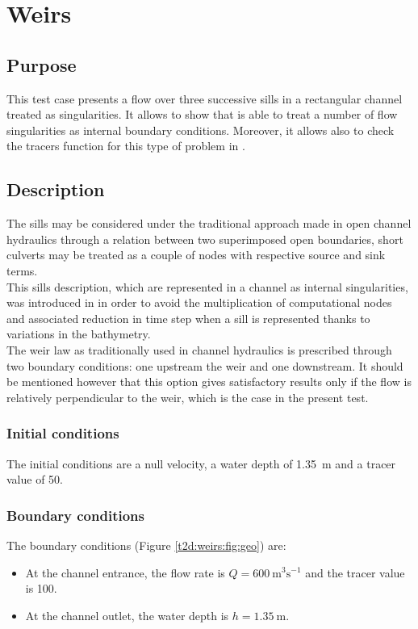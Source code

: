 \chapter{Weirs}

\section{Purpose}
This test case presents a flow over three successive sills in
a rectangular channel treated as singularities. It allows to show
that  is able to treat a number of flow singularities
as internal boundary conditions. Moreover, it allows also to check
the tracers function for this type of problem in .

\section{Description}

The sills may be considered under the traditional approach made
in open channel hydraulics through a relation between two superimposed
open boundaries, short culverts may be treated as a couple of nodes
 with respective source and sink terms.\\

This sills description, which are represented in a channel as internal
singularities, was introduced in  in order to avoid the
multiplication of computational nodes and associated reduction in time
step when a sill is represented thanks to variations in the bathymetry.\\
The weir law as traditionally used in channel hydraulics is prescribed
through two boundary conditions: one upstream the weir and one downstream.
It should be mentioned however that this option gives satisfactory results
only if the flow is relatively perpendicular to the weir, which is
the case in the present test.

\subsection{Initial conditions}

The initial conditions are a null velocity,
a water depth of 1.35~m and a tracer value of 50.

\subsection{Boundary conditions}

The boundary conditions (Figure \ref{t2d:weirs:fig:geo}) are:
\begin{itemize}
\item At the channel entrance, the flow rate is
$Q = 600~\text{m}^3\text{s}^{-1}$ and the tracer value is 100.
\item At the channel outlet, the water depth is
$h=1.35~\text{m}$.
\end{itemize}

